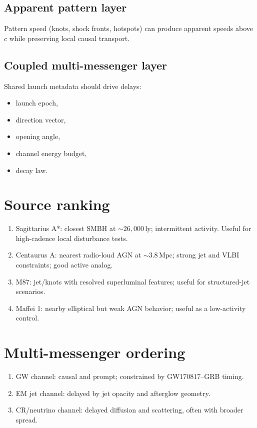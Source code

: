 \documentclass[11pt]{article}
\begin{document}
\subsection{Apparent pattern layer}
Pattern speed (knots, shock fronts, hotspots) can produce apparent speeds above $c$ while preserving local causal transport.

\subsection{Coupled multi-messenger layer}
Shared launch metadata should drive delays:
\begin{itemize}
\item launch epoch,
\item direction vector,
\item opening angle,
\item channel energy budget,
\item decay law.
\end{itemize}

\section{Source ranking}
\begin{enumerate}
\item Sagittarius A*: closest SMBH at $\sim26{,}000\,\mathrm{ly}$; intermittent activity. Useful for high-cadence local disturbance tests.
\item Centaurus A: nearest radio-loud AGN at $\sim3.8\,\mathrm{Mpc}$; strong jet and VLBI constraints; good active analog.
\item M87: jet/knots with resolved superluminal features; useful for structured-jet scenarios.
\item Maffei 1: nearby elliptical but weak AGN behavior; useful as a low-activity control.
\end{enumerate}

\section{Multi-messenger ordering}
\begin{enumerate}
\item GW channel: causal and prompt; constrained by GW170817--GRB timing.
\item EM jet channel: delayed by jet opacity and afterglow geometry.
\item CR/neutrino channel: delayed diffusion and scattering, often with broader spread.
\end{enumerate}
\end{document}

